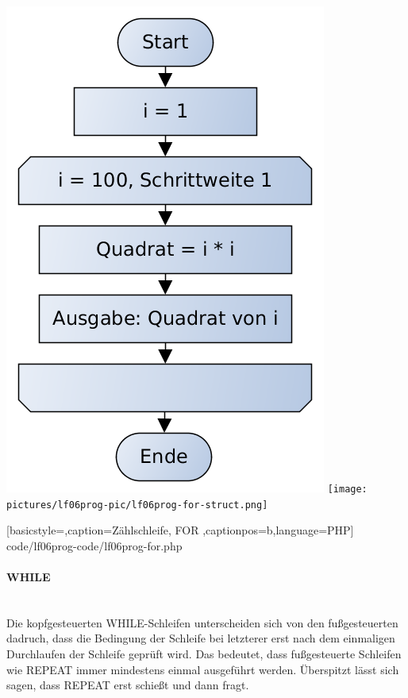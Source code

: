 \includegraphics[scale=0.4]{pictures/lf06prog-pic/lf06prog-for-pap.png}
\texttt{[image: pictures/lf06prog-pic/lf06prog-for-struct.png]}


	[basicstyle=\small,caption={Zählschleife, FOR}
	\label{lst:while-fuss},captionpos=b,language=PHP]
	{code/lf06prog-code/lf06prog-for.php}

\paragraph{WHILE}~\\

Die kopfgesteuerten WHILE-Schleifen unterscheiden sich von den fußgesteuerten dadruch, dass die Bedingung der Schleife bei letzterer erst nach dem einmaligen Durchlaufen der Schleife geprüft wird. Das bedeutet, dass fußgesteuerte Schleifen wie REPEAT immer mindestens einmal ausgeführt werden. Überspitzt lässt sich sagen, dass REPEAT erst schießt und dann fragt.

